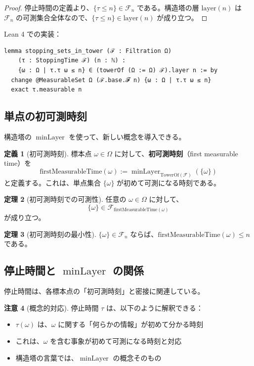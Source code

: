 \documentclass[12pt,a4paper]{article}
\theoremstyle{definition}
\newtheorem{definition}{定義}[section]
\newtheorem{theorem}[definition]{定理}
\newtheorem{remark}[definition]{注意}
\newcommand{\cF}{\mathcal{F}}
\DeclareMathOperator{\minLayer}{minLayer}
\begin{document}
\begin{proof}
停止時間の定義より、$\{\tau \leq n\} \in \cF_n$ である。構造塔の層 $\text{layer}(n)$ は $\cF_n$ の可測集合全体なので、$\{\tau \leq n\} \in \text{layer}(n)$ が成り立つ。
\end{proof}

Lean 4 での実装：

\begin{lstlisting}[language=Lean]
lemma stopping_sets_in_tower (ℱ : Filtration Ω)
    (τ : StoppingTime ℱ) (n : ℕ) :
    {ω : Ω | τ.τ ω ≤ n} ∈ (towerOf (Ω := Ω) ℱ).layer n := by
  change @MeasurableSet Ω (ℱ.base.𝓕 n) {ω : Ω | τ.τ ω ≤ n}
  exact τ.measurable n
\end{lstlisting}

\subsection{単点の初可測時刻}

構造塔の $\minLayer$ を使って、新しい概念を導入できる。

\begin{definition}[初可測時刻]
標本点 $\omega \in \Omega$ に対して、\textbf{初可測時刻}（first measurable time）を
\[
\text{firstMeasurableTime}(\omega) := \minLayer_{\text{TowerOf}(\cF)}(\{\omega\})
\]
と定義する。これは、単点集合 $\{\omega\}$ が初めて可測になる時刻である。
\end{definition}

\begin{theorem}[初可測時刻での可測性]
任意の $\omega \in \Omega$ に対して、
\[
\{\omega\} \in \cF_{\text{firstMeasurableTime}(\omega)}
\]
が成り立つ。
\end{theorem}

\begin{theorem}[初可測時刻の最小性]
$\{\omega\} \in \cF_n$ ならば、$\text{firstMeasurableTime}(\omega) \leq n$ である。
\end{theorem}

\subsection{停止時間と $\minLayer$ の関係}

停止時間は、各標本点の「初可測時刻」と密接に関連している。

\begin{remark}[概念的対応]
停止時間 $\tau$ は、以下のように解釈できる：
\begin{itemize}
\item $\tau(\omega)$ は、$\omega$ に関する「何らかの情報」が初めて分かる時刻
\item これは、$\omega$ を含む事象が初めて可測になる時刻と対応
\item 構造塔の言葉では、$\minLayer$ の概念そのもの
\end{itemize}
\end{remark}
\end{document}
